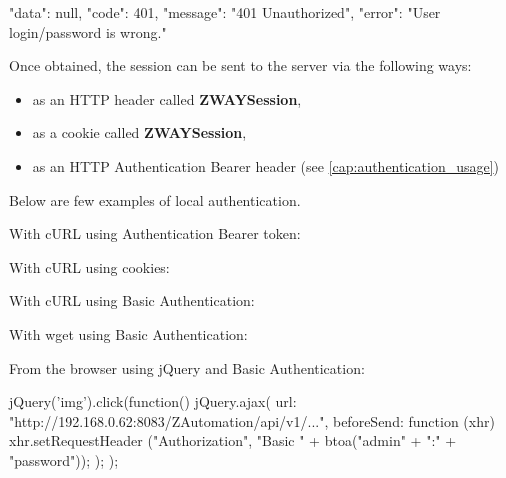 \begin{listingverbatim}
{
    "data": null,
    "code": 401,
    "message": "401 Unauthorized",
    "error": "User login/password is wrong."
}
\end{listingverbatim}

Once obtained, the session can be sent to the \zway server via the following ways:
\begin{itemize}
\item as an HTTP header called \textbf{ZWAYSession},
\item as a cookie called \textbf{ZWAYSession},
\item as an HTTP Authentication Bearer header (see \ref{cap:authentication_usage})
\end{itemize}

Below are few examples of local authentication.

With cURL using Authentication Bearer token:
{\scriptsize
\begin{quote} 
\end{quote}
}

With cURL using cookies:
{\scriptsize
\begin{quote} 
\end{quote}
}

With cURL using Basic Authentication:
{\scriptsize
\begin{quote} 
\end{quote}
}

With wget using Basic Authentication:
{\scriptsize
\begin{quote} 
\end{quote}
}

From the browser using jQuery and Basic Authentication:
\begin{listingverbatim}
jQuery('img').click(function() {
    jQuery.ajax({
        url: "http://192.168.0.62:8083/ZAutomation/api/v1/...",
        beforeSend: function (xhr) { xhr.setRequestHeader ("Authorization", "Basic " + btoa("admin" + ":" + "password")); }
    });
});
\end{listingverbatim}

